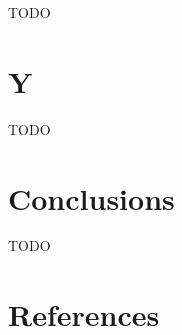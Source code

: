\documentclass[numbers,sort&compress]{IntechOpen-Book}%
\begin{document}
TODO

\section{Y}

TODO

\begin{backmatter}

\section{Conclusions}

TODO

\begin{authordetails}

	\author{Georg Hackenberg$^{1*\dagger}$ and Christian Zehetner$^{1\dagger}$}
	\address[1]{School of Engineering, University of Applied Sciences Upper Austria, Wels, Austria}
	\address{*Address all correspondence to: georg.hackenberg@fh-wels.at}
	\address{\dag\ These authors contributed equally}
	
	
\end{authordetails}

\section*{References}




\end{backmatter}
\end{document}
